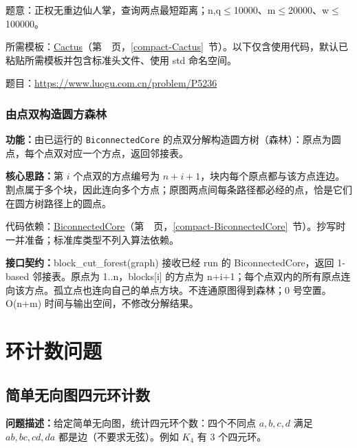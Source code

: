 \label{usage-example-382}

题意：正权无重边仙人掌，查询两点最短距离；n,q$\le$10000、m$\le$20000、w$\le$100000。

所需模板：\hyperref[compact-Cactus]{Cactus}（第~\pageref{compact-Cactus}~页，\ref{compact-Cactus}~节）。以下仅含使用代码，默认已粘贴所需模板并包含标准头文件、使用 std 命名空间。

题目：\url{https://www.luogu.com.cn/problem/P5236}



\subsection{由点双构造圆方森林}\label{compact-block_cut_forest}

\noindent\textbf{功能：}\allowbreak 由已运行的 \texttt{BiconnectedCore} 的点双分解构造圆方树（森林）：原点为圆点，每个点双对应一个方点，返回邻接表。

\textbf{核心思路：}\allowbreak 第 $i$ 个点双的方点编号为 $n+i+1$，块内每个原点都与该方点连边。割点属于多个块，因此连向多个方点；原图两点间每条路径都必经的点，恰是它们在圆方树路径上的圆点。

代码依赖：\hyperref[compact-BiconnectedCore]{BiconnectedCore}（第~\pageref{compact-BiconnectedCore}~页，\ref{compact-BiconnectedCore}~节）。抄写时一并准备；标准库类型不列入算法依赖。

{\sloppy{}\noindent\textbf{接口契约：}block\_cut\_forest(graph) 接收已经 run 的 BiconnectedCore，返回 1-based 邻接表。原点为 1..n，blocks[i] 的方点为 n+i+1；每个点双内的所有原点连向该方点。孤立点也连向自己的单点方块。不连通原图得到森林；0 号空置。O(n+m) 时间与输出空间，不修改分解结果。\par}



\Needspace{619pt}

\chapter{环计数问题}

\section{简单无向图四元环计数}\label{compact-count_four_cycles}

\noindent\textbf{问题描述：}\allowbreak 给定简单无向图，统计四元环个数：四个不同点 $a,b,c,d$ 满足 $ab,bc,cd,da$ 都是边（不要求无弦）。例如 $K_4$ 有 3 个四元环。

